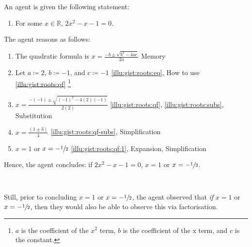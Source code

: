 \begin{note}
  \begin{scenario}
    \label{illu:gist:roots}
    An agent is given the following statement:

    \begin{enumerate}[label=\arabic*., ref=(\arabic*)]
    \item
      \label{illu:gist:roots:eq}
      For some \(x \in \mathbb{R}\), \(2x^{2} - x - 1 = 0\).
    \end{enumerate}

    The agent reasons as follows:

    \begin{enumerate}[label=\arabic*., ref=(\arabic*), resume, itemsep=.125em]
    \item
      \label{illu:gist:roots:qf}
      The quadratic formula is \(x = \frac{-b \pm \sqrt{b^{2} - 4ac}}{2a}\) \hfill Memory
    \item
      \label{illu:gist:roots:subs}
      Let \(a \coloneq 2\), \(b \coloneq -1\), and \(c \coloneq -1\) \hfill \ref{illu:gist:roots:eq}, How to use \ref{illu:gist:roots:qf}%
      \footnote{
        \(a\) is the coefficient of the \(x^{2}\) term, \(b\) is the coefficient of the x term, and \(c\) is the constant.
      }
    \item
      \label{illu:gist:roots:qf-subs}
      \(x = \frac{-(-1) \pm \sqrt{(-1)^{2} - 4(2)(-1)}}{2(2)}\) \hfill \ref{illu:gist:roots:qf}, \ref{illu:gist:roots:subs}, Substitution
    \item
      \label{illu:gist:roots:qf:1}
      \(x = \frac{(1 \pm 3)}{4}\) \hfill \ref{illu:gist:roots:qf-subs}, Simplification
    \item
      \label{illu:gist:roots:qf:done}
      \(x = 1\) or \(x = -\sfrac{1}{2}\) \hfill \ref{illu:gist:roots:qf:1}, Expansion, Simplification
    \end{enumerate}
    Hence, the agent concludes: if \(2x^{2} - x - 1 = 0\), \(x = 1\) or \(x = -\sfrac{1}{2}\).

    \mbox{ }

    Still, prior to concluding \(x = 1\) or \(x = -\sfrac{1}{2}\), the agent observed that \emph{if} \(x = 1\) or \(x = -\sfrac{1}{2}\), then they would also be able to observe this via factorisation.
  \end{scenario}


\end{note}
